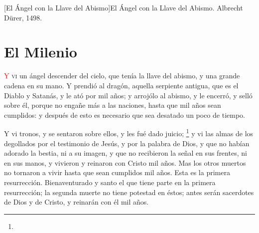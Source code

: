 [El Ángel con la Llave del Abismo]{El Ángel con la Llave del Abismo. Albrecht Dürer, 1498.}

\chapter{El Milenio}
\lettrine[lines=3,slope=-0.5em,loversize=0.1]{\textcolor{red}{Y}}{\hspace{0.5em} vi} un ángel descender del cielo, que tenía la llave del abismo, y una grande cadena en su mano. 
Y prendió al dragón, aquella serpiente antigua, que es el Diablo y Satanás, y le ató por mil años; 
y arrojólo al abismo, y le encerró,%
 y selló sobre él, porque no engañe más a las naciones, hasta que mil años sean cumplidos: y después de esto es necesario que sea desatado un poco de tiempo.

Y vi tronos, y se sentaron sobre ellos, y les fué dado juicio;%
	\footnote{ %
			  } %
 y vi las almas de los degollados por el testimonio de Jesús, y por la palabra de Dios, y que no habían adorado la bestia, ni a su imagen, y que no recibieron la señal en sus frentes, ni en sus manos, y vivieron%
 y reinaron con Cristo mil años.%
Mas los otros muertos no tornaron a vivir hasta que sean cumplidos mil años. Esta es la primera resurrección.
Bienaventurado y santo el que tiene parte en la primera resurrección; la segunda muerte no tiene potestad en éstos; antes serán sacerdotes de Dios y de Cristo, y reinarán con él mil años.

